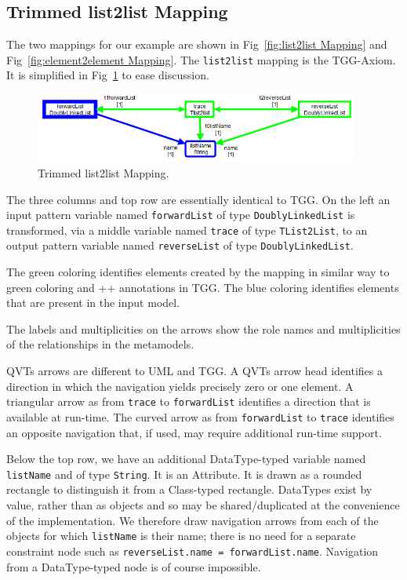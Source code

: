 \documentclass{llncs}
\begin{document}
\subsection{Trimmed list2list Mapping}

The two mappings for our example are shown in Fig~\ref{fig:list2list Mapping} and Fig~\ref{fig:element2element Mapping}. The \verb$list2list$ mapping is the TGG-Axiom. It is simplified in Fig~\ref{fig:Trimmed list2list Mapping} to ease discussion.

\begin{figure}[h]
	\centering
	\includegraphics[width=0.95\textwidth]{list2listTrimmed.png}
	\caption{Trimmed list2list Mapping.}
	\label{fig:Trimmed list2list Mapping}
\end{figure}

The three columns and top row are essentially identical to TGG. On the left an input pattern variable named \verb$forwardList$ of type \verb$DoublyLinkedList$ is transformed, via a middle variable named \verb$trace$ of type \verb$TList2List$, to an output pattern variable named \verb$reverseList$ of type \verb$DoublyLinkedList$.

The green coloring identifies elements created by the mapping in similar way to green coloring and ++ annotations in TGG. The blue coloring identifies elements that are present in the input model.

The labels and multiplicities on the arrows show the role names and multiplicities of the relationships in the metamodels.

QVTs arrows are different to UML and TGG. A QVTs arrow head identifies a direction in which the navigation yields precisely zero or one element. A triangular arrow as from \verb$trace$ to \verb$forwardList$ identifies a direction that is available at run-time. The curved arrow as from \verb$forwardList$ to \verb$trace$ identifies an opposite navigation that, if used, may require additional run-time support.

Below the top row, we have an additional DataType-typed variable named \verb$listName$ and of type \verb$String$. It is an Attribute. It is drawn as a rounded rectangle to distinguish it from a Class-typed rectangle. DataTypes exist by value, rather than as objects and so may be shared/duplicated at the convenience of the implementation. We therefore draw navigation arrows from each of the objects for which \verb$listName$ is their name; there is no need for a separate constraint node such as \verb$reverseList.name = forwardList.name$. Navigation from a DataType-typed node is of course impossible.
\end{document}
